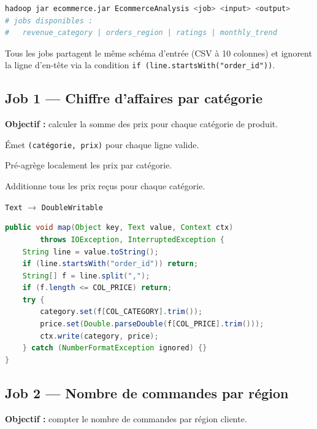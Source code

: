 \documentclass[12pt,a4paper]{article}
\begin{document}
\begin{lstlisting}[language=bash, caption={Invocation d'un job MapReduce}]
hadoop jar ecommerce.jar EcommerceAnalysis <job> <input> <output>
# jobs disponibles :
#   revenue_category | orders_region | ratings | monthly_trend
\end{lstlisting}

Tous les jobs partagent le même schéma d'entrée (CSV à 10 colonnes) et ignorent
la ligne d'en-tête via la condition \texttt{if (line.startsWith("order\_id"))}.

\subsection{Job 1 — Chiffre d'affaires par catégorie}

\textbf{Objectif :} calculer la somme des prix pour chaque catégorie de produit.

\begin{description}[leftmargin=2em]
  \item[Mapper] Émet \texttt{(catégorie, prix)} pour chaque ligne valide.
  \item[Combiner] Pré-agrège localement les prix par catégorie.
  \item[Reducer] Additionne tous les prix reçus pour chaque catégorie.
  \item[Types de sortie] \texttt{Text} $\rightarrow$ \texttt{DoubleWritable}
\end{description}

\begin{lstlisting}[language=java, caption={Mapper — Chiffre d'affaires par catégorie}]
public void map(Object key, Text value, Context ctx)
        throws IOException, InterruptedException {
    String line = value.toString();
    if (line.startsWith("order_id")) return;
    String[] f = line.split(",");
    if (f.length <= COL_PRICE) return;
    try {
        category.set(f[COL_CATEGORY].trim());
        price.set(Double.parseDouble(f[COL_PRICE].trim()));
        ctx.write(category, price);
    } catch (NumberFormatException ignored) {}
}
\end{lstlisting}

\subsection{Job 2 — Nombre de commandes par région}

\textbf{Objectif :} compter le nombre de commandes par région cliente.
\end{document}

